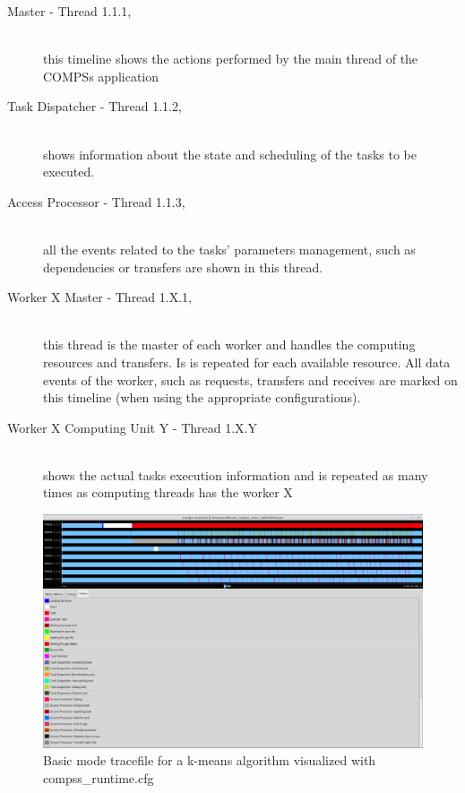 \begin{description}
 \item [Master - Thread 1.1.1, ] \hfill \\ this timeline shows the actions performed by the main thread of the COMPSs application
 \item [Task Dispatcher - Thread 1.1.2,] \hfill \\ shows information about the state and scheduling of the tasks to be executed.
 \item [Access Processor - Thread 1.1.3,] \hfill \\  all the events related to the tasks' parameters management, such as dependencies or transfers are shown in this thread.
 \item [Worker X Master - Thread 1.X.1,] \hfill \\ this thread is the master of each worker and handles the computing resources and transfers.  Is is repeated for each available resource. All data events of the worker, such as requests, transfers and receives are marked on this timeline (when using the appropriate configurations).
 \item [Worker X Computing Unit Y - Thread 1.X.Y] \hfill \\ shows the actual tasks execution information and  is repeated as many times as computing threads has the worker X
\end{description}


\begin{landscape}
\begin{figure}[ht!]
  \centering
    \includegraphics[width=\linewidth]{./Sections/2_Execution/Figures/basic.png}
    \caption{Basic mode tracefile for a k-means algorithm visualized with compss\_runtime.cfg}
    \label{fig:basic_trace}
\end{figure}
\end{landscape}

